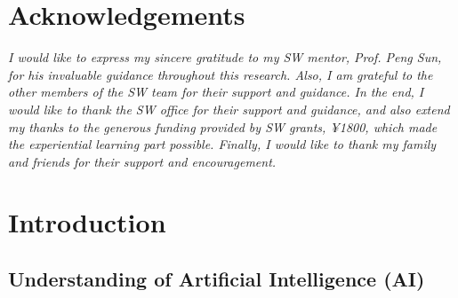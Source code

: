\documentclass[11pt,a4paper,oneside]{report}
\newcommand{\instructions}[1]{{\color{black}\itshape #1}}
\begin{document}

\chapter*{Acknowledgements}
\label{acknowledgements}

\instructions{I would like to express my sincere gratitude to my SW mentor, Prof. Peng Sun, 
for his invaluable guidance throughout this research. 
Also, I am grateful to the other members of the SW team for their support and guidance. 
In the end, I would like to thank the SW office for their support and guidance, 
and also extend my thanks to the generous funding provided by SW grants, ¥1800, which made the experiential learning part possible. 
Finally, I would like to thank my family and friends for their support and encouragement. 
}

\newpage


\setcounter{tocdepth}{1}
\listoffigures\newpage


\setcounter{tocdepth}{1}
\listoftables\newpage



\clearpage
{}


\chapter{Introduction}
\label{introduction}
\section{Understanding of Artificial Intelligence (AI)}
\end{document}
